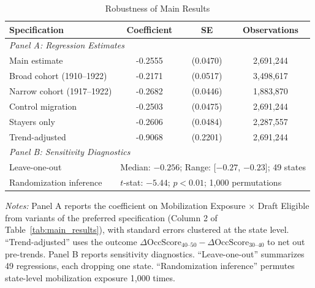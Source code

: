 \begin{table}[htbp]
\centering
\caption{Robustness of Main Results}
\label{tab:robustness}
\begin{tabular}{lccc}
\toprule
Specification & Coefficient & SE & Observations \\
\midrule
\multicolumn{4}{l}{\textit{Panel A: Regression Estimates}} \\[3pt]
Main estimate & -0.2555 & (0.0470) & 2,691,244 \\
Broad cohort (1910--1922) & -0.2171 & (0.0517) & 3,498,617 \\
Narrow cohort (1917--1922) & -0.2682 & (0.0446) & 1,883,870 \\
Control migration & -0.2503 & (0.0475) & 2,691,244 \\
Stayers only & -0.2606 & (0.0484) & 2,287,557 \\
Trend-adjusted & -0.9068 & (0.2201) & 2,691,244 \\
\midrule
\multicolumn{4}{l}{\textit{Panel B: Sensitivity Diagnostics}} \\[3pt]
Leave-one-out & \multicolumn{3}{l}{Median: $-0.256$; Range: [$-0.27$, $-0.23$]; 49 states} \\
Randomization inference & \multicolumn{3}{l}{$t$-stat: $-5.44$; $p < 0.01$; 1{,}000 permutations} \\
\bottomrule
\end{tabular}
\begin{tablenotes}
\small
\item \textit{Notes:} Panel A reports the coefficient on Mobilization Exposure $\times$ Draft Eligible from variants of the preferred specification (Column 2 of Table~\ref{tab:main_results}), with standard errors clustered at the state level. ``Trend-adjusted'' uses the outcome $\Delta\text{OccScore}_{40\text{--}50} - \Delta\text{OccScore}_{30\text{--}40}$ to net out pre-trends. Panel B reports sensitivity diagnostics. ``Leave-one-out'' summarizes 49 regressions, each dropping one state. ``Randomization inference'' permutes state-level mobilization exposure 1,000 times.
\end{tablenotes}
\end{table}
